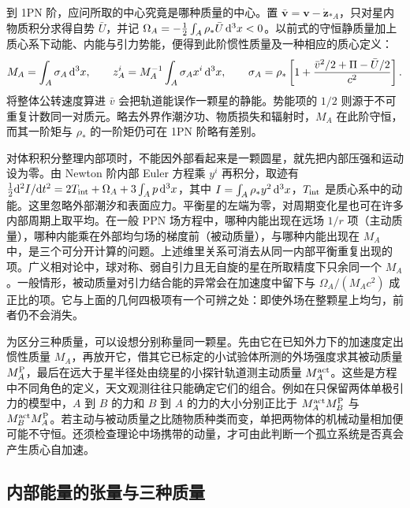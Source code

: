 到 1PN 阶，应问所取的中心究竟是哪种质量的中心。置 $\bar{\bm v}=\bm v-\dot{\bm z}_{*A}$，只对星内物质积分求得自势 $\bar U$，并记 $\Omega_A=-\tfrac12\int_A\rho_*\bar U\,\dd^3x<0$。以前式的守恒静质量加上质心系下动能、内能与引力势能，便得到此阶惯性质量及一种相应的质心定义：
\[
 M_A=\int_A\sigma_A\,\dd^3x,\qquad
 z_A^i=M_A^{-1}\int_A\sigma_A x^i\,\dd^3x,\qquad
 \sigma_A=\rho_*\left[1+\frac{\bar v^2/2+\Pi-\bar U/2}{c^2}\right].
\]
将整体公转速度算进 $\bar v$ 会把轨道能误作一颗星的静能。势能项的 $1/2$ 则源于不可重复计数同一对质元。略去外界作潮汐功、物质损失和辐射时，$M_A$ 在此阶守恒，而其一阶矩与 $\rho_*$ 的一阶矩仍可在 1PN 阶略有差别。

对体积积分整理内部项时，不能因外部看起来是一颗圆星，就先把内部压强和运动设为零。由 Newton 阶内部 Euler 方程乘 $y^i$ 再积分，取迹有 $\tfrac12\mathrm d^2 I/\mathrm dt^2=2T_{\rm int}+\Omega_A+3\int_Ap\,\dd^3x$，其中 $I=\int_A\rho_*y^2\,\dd^3x$，$T_{\rm int}$ 是质心系中的动能。这里忽略外部潮汐和表面应力。平衡星的左端为零，对周期变化星也可在许多内部周期上取平均。在一般 PPN 场方程中，哪种内能出现在远场 $1/r$ 项（主动质量），哪种内能乘在外部均匀场的梯度前（被动质量），与哪种内能出现在 $M_A$ 中，是三个可分开计算的问题。上述维里关系可消去从同一内部平衡重复出现的项。广义相对论中，球对称、弱自引力且无自旋的星在所取精度下只余同一个 $M_A$。一般情形，被动质量对引力结合能的异常会在加速度中留下与 $\Omega_A/(M_Ac^2)$ 成正比的项。它与上面的几何四极项有一个可辨之处：即使外场在整颗星上均匀，前者仍不会消失。

为区分三种质量，可以设想分别称量同一颗星。先由它在已知外力下的加速度定出惯性质量 $M_A$，再放开它，借其它已标定的小试验体所测的外场强度求其被动质量 $M_A^{\rm P}$，最后在远大于星半径处由绕星的小探针轨道测主动质量 $M_A^{\rm act}$。这些是方程中不同角色的定义，天文观测往往只能确定它们的组合。例如在只保留两体单极引力的模型中，$A$ 到 $B$ 的力和 $B$ 到 $A$ 的力的大小分别正比于 $M_A^{\rm act}M_B^{\rm P}$ 与 $M_B^{\rm act}M_A^{\rm P}$。若主动与被动质量之比随物质种类而变，单把两物体的机械动量相加便可能不守恒。还须检查理论中场携带的动量，才可由此判断一个孤立系统是否真会产生质心自加速。

\subsection{内部能量的张量与三种质量}


